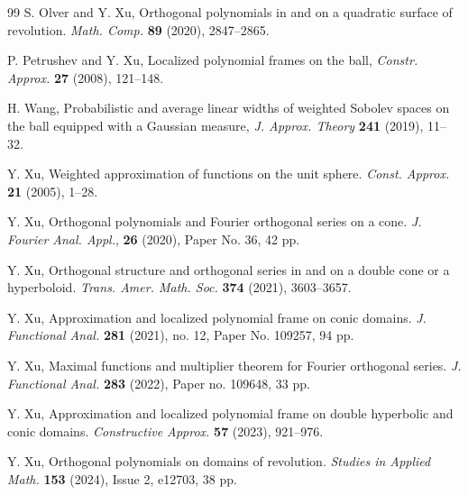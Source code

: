 \documentclass{amsart}
\theoremstyle{remark}
\def\RR{{\mathbb R}}
\begin{document}
\begin{thebibliography}{99}
        S. Olver and Y. Xu, 
        Orthogonal polynomials in and on a quadratic surface of revolution. 
        \textit{Math. Comp.} \textbf{89} (2020), 2847--2865.

        P. Petrushev and Y. Xu, Localized polynomial frames on the ball, 
        \textit{Constr. Approx.} \textbf{27} (2008), 121--148.
 


        H. Wang,
        Probabilistic and average linear widths of weighted Sobolev spaces on the ball equipped
        with a Gaussian measure,  \textit{J. Approx. Theory}  \textbf{241} (2019), 11--32.
        
       Y. Xu,
       Weighted approximation of functions on the unit sphere.
       \textit{Const. Approx.} \textbf{21} (2005), 1--28.          
        
       Y. Xu, 
      Orthogonal polynomials and Fourier orthogonal series on a cone. 
       \textit{J. Fourier Anal. Appl.}, \textbf{26} (2020), Paper No. 36, 42 pp.

       Y. Xu, 
       Orthogonal structure and orthogonal series in and on a double cone or a hyperboloid. 
       \textit{Trans. Amer. Math. Soc.} \textbf{374} (2021), 3603--3657.

       Y. Xu, 
       Approximation and localized polynomial frame on conic domains. 
       \textit{J. Functional Anal.} \textbf{281} (2021), no. 12, Paper No. 109257, 94 pp.  

       Y. Xu, 
       Maximal functions and multiplier theorem for Fourier orthogonal series. 
       \textit{J. Functional Anal.} \textbf{283} (2022), Paper no. 109648, 33 pp.

       Y. Xu,
       Approximation and localized polynomial frame on double hyperbolic and conic domains. 
       \textit{Constructive Approx.} \textbf{57} (2023), 921--976.

  
       Y. Xu, 
       Orthogonal polynomials on domains of revolution. 
       \textit{Studies in Applied Math.} \textbf{153} (2024), Issue 2, e12703, 38 pp.
                 
\end{thebibliography}
\end{document}

